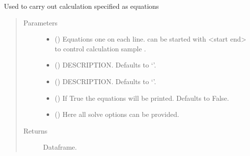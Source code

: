 \documentclass[letterpaper,10pt,english]{sphinxmanual}
\begin{document}

\begin{fulllineitems}
\label{\detokenize{index:modelmf.mfcalc}}
\pysigstartsignatures
{}
\pysigstopsignatures
\sphinxAtStartPar
Used to carry out calculation specified as equations
\begin{quote}\begin{description}
\item[{Parameters}] \leavevmode\begin{itemize}
\item {} 
\sphinxAtStartPar
{} () \textendash{} Equations one on each line. can be started with \textless{}start end\textgreater{} to control calculation sample .

\item {} 
\sphinxAtStartPar
{} (\sphinxstyleliteralemphasis{\sphinxupquote{, }}) \textendash{} DESCRIPTION. Defaults to ‘’.

\item {} 
\sphinxAtStartPar
{} (\sphinxstyleliteralemphasis{\sphinxupquote{, }}) \textendash{} DESCRIPTION. Defaults to ‘’.

\item {} 
\sphinxAtStartPar
{} (\sphinxstyleliteralemphasis{\sphinxupquote{, }}) \textendash{} If True the equations will be printed. Defaults to False.

\item {} 
\sphinxAtStartPar
{} () \textendash{} Here all solve options can be provided.

\end{itemize}

\item[{Returns}] \leavevmode
\sphinxAtStartPar
Dataframe.


\end{description}
\end{quote}
\end{fulllineitems}
\end{document}
